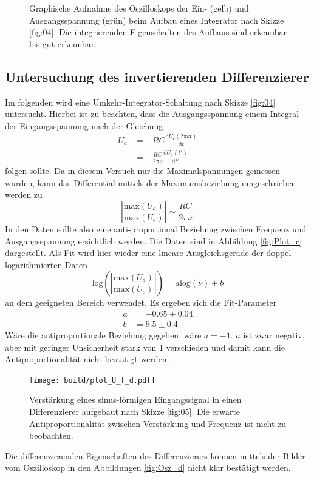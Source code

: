 \begin{figure}
\begin{subfigure}{0.4\textwidth}
  \end{subfigure}
  \caption{Graphische Aufnahme des Oszilloskops der Ein- (gelb) und Ausgangsspannung (grün) beim Aufbau eines Integrator nach Skizze \ref{fig:04}. Die integrierenden Eigenschaften des Aufbaus sind erkennbar bis gut erkennbar.}
  \label{fig:Osz_c}
\end{figure}

\subsection{Untersuchung des invertierenden Differenzierer}
Im folgenden wird eine Umkehr-Integrator-Schaltung nach Skizze \ref{fig:04} untersucht. Hierbei ist zu beachten, dass die Ausgangsspannung einem Integral der Eingangsspannung nach der Gleichung
\begin{align}
  U_a &= -RC\frac{\text{d}U_e(2\pi \nu t)}{\text{d}t}\\
      &= -\frac{RC}{2\pi\nu} \frac{\text{d}U_e(t')}{\text{d}t'}
\end{align}
folgen sollte. Da in diesem Versuch nur die Maximalspannungen gemessen wurden, kann das Differential mittels der Maximumsbeziehung umgeschrieben werden zu
\begin{equation}
  \left|\frac{\text{max}\left(U_a\right)}{\text{max}\left(U_e\right)}\right| \sim \frac{RC}{2\pi\nu}.
\end{equation}
In den Daten sollte also eine anti-proportional Beziehnug zwischen Frequenz und Ausgangsspannung ersichtlich werden. Die Daten sind in Abbildung \ref{fig:Plot_c} dargestellt. Als Fit wird hier wieder eine lineare Ausgleichsgerade der doppel-logarithmierten Daten
\begin{equation}
  \text{log}\left(\left|\frac{\text{max}\left(U_a\right)}{\text{max}\left(U_e\right)}\right|\right) = a\text{log}\left(\nu \right)+b
\end{equation}
an dem geeigneten Bereich verwendet. Es ergeben sich die Fit-Parameter
\begin{align}
  a &= -0.65\pm 0.04\\
  b &= 9.5\pm 0.4
\end{align}
Wäre die antiproportionale Beziehnug gegeben, wäre $a=-1$. $a$ ist zwar negativ, aber mit geringer Unsicherheit stark von 1 verschieden und damit kann die Antiproportionalität nicht bestätigt werden.

\begin{figure}
  \centering
  \texttt{[image: build/plot\_U\_f\_d.pdf]}
  \caption{Verstärkung eines sinus-förmigen Eingangssignal in einen Differenzierer aufgebaut nach Skizze \ref{fig:05}. Die erwarte Antiproportionalität zwischen Verstärkung und Frequenz ist nicht zu beobachten.}
  \label{fig:Plot_d}
\end{figure}
Die differenzierenden Eigenschaften des Differenzierers können mittels der Bilder vom Oszilloskop in den Abbildungen \ref{fig:Osz_d} nicht klar bestätigt werden.

